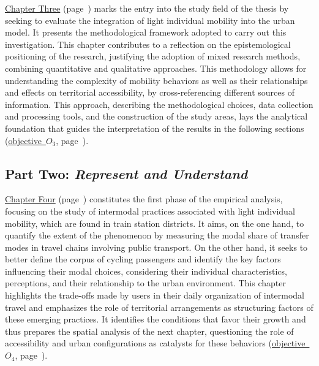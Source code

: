 \begin{refsegment}
\hyperref[chap3:titre]{Chapter Three} (page~\pageref{chap3:titre}) marks the entry into the study field of the thesis by seeking to evaluate the integration of light individual mobility into the urban model. It presents the methodological framework adopted to carry out this investigation. This chapter contributes to a reflection on the epistemological positioning of the research, justifying the adoption of mixed research methods, combining quantitative and qualitative approaches. This methodology allows for understanding the complexity of mobility behaviors as well as their relationships and effects on territorial accessibility, by cross-referencing different sources of information. This approach, describing the methodological choices, data collection and processing tools, and the construction of the study areas, lays the analytical foundation that guides the interpretation of the results in the following sections (\hyperref[objectif-3]{objective~\(O_3\)}, page~\pageref{objectif-3}).%

\subsection*{Part Two: \textsl{Represent and Understand}
    \label{introduction-generale:annonce-plan-2}
    }

\hyperref[chap4:titre]{Chapter Four} (page~\pageref{chap4:titre}) constitutes the first phase of the empirical analysis, focusing on the study of intermodal practices associated with light individual mobility, which are found in train station districts. It aims, on the one hand, to quantify the extent of the phenomenon by measuring the modal share of transfer modes in travel chains involving public transport. On the other hand, it seeks to better define the corpus of cycling passengers and identify the key factors influencing their modal choices, considering their individual characteristics, perceptions, and their relationship to the urban environment. This chapter highlights the trade-offs made by users in their daily organization of intermodal travel and emphasizes the role of territorial arrangements as structuring factors of these emerging practices. It identifies the conditions that favor their growth and thus prepares the spatial analysis of the next chapter, questioning the role of accessibility and urban configurations as catalysts for these behaviors (\hyperref[objectif-4]{objective~\(O_4\)}, page~\pageref{objectif-4}).%


\end{refsegment}
